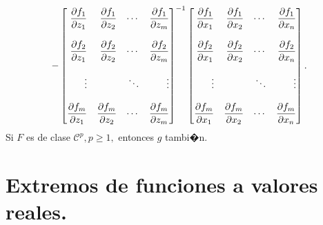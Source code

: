 \documentclass[a4paper]{scrartcl} %
\begin{document}
\begin{theorem}
\[ -\begin{bmatrix*}[r]
                \dif{f_1}{z_1} & \dif{f_1}{z_2} & \cdots & \dif{f_1}{z_m} \\
                               &                &        &                \\
                \dif{f_2}{z_1} & \dif{f_2}{z_2} & \cdots & \dif{f_2}{z_m} \\
                               &                &        &                \\
                \vdots         &                & \ddots & \vdots         \\
                               &                &        &                \\
                \dif{f_m}{z_1} & \dif{f_m}{z_2} & \cdots & \dif{f_m}{z_m}
                \end{bmatrix*}^{-1}
  \begin{bmatrix*}[r]
                \dif{f_1}{x_1} & \dif{f_1}{x_2} & \cdots & \dif{f_1}{x_n} \\
                               &                &        &                \\
                \dif{f_2}{x_1} & \dif{f_2}{x_2} & \cdots & \dif{f_2}{x_n} \\
                               &                &        &                \\
                \vdots         &                & \ddots & \vdots         \\
                               &                &        &                \\
                \dif{f_m}{x_1} & \dif{f_m}{x_2} & \cdots & \dif{f_m}{x_n}
                \end{bmatrix*}.            
 \]
Si $F$ es de clase $\mathcal{C}^p, p \ge 1,$ entonces $g$ tambi�n.
 
\end{theorem}

\section{Extremos de funciones a valores reales.} \label{sec:extremos}
\end{document}
